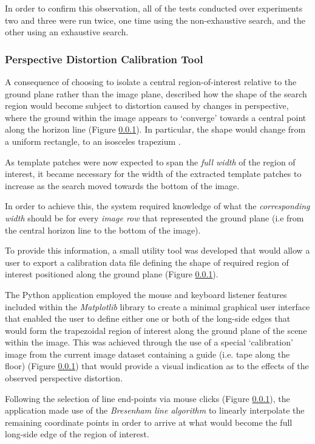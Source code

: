 In order to confirm this observation, all of the tests conducted over experiments two and three were run twice, one time using the non-exhaustive search, and the other using an exhaustive search.

\subsubsection{Perspective Distortion Calibration Tool}

A consequence of choosing to isolate a central region-of-interest relative to the ground plane rather than the image plane, described how the shape of the search region would become subject to distortion caused by changes in perspective, where the ground within the image appears to `converge' towards a central point along the horizon line (Figure \ref{}). In particular, the shape would change from a uniform rectangle, to an isosceles trapezium \cite{trapezium}.

As template patches were now expected to span the \textit{full width} of the region of interest, it became necessary for the width of the extracted template patches to increase as the search moved towards the bottom of the image. 

In order to achieve this, the system required knowledge of what the \textit{corresponding width} should be for every \textit{image row} that represented the ground plane (i.e from the central horizon line to the bottom of the image). 

To provide this information, a small utility tool was developed that would allow a user to export a calibration data file defining the shape of required region of interest positioned along the ground plane (Figure \ref{}). 

The Python application employed the mouse and keyboard listener features included within the \textit{Matplotlib} library \cite{matplotlib} to create a minimal graphical user interface that enabled the user to define either one or both of the long-side edges that would form the trapezoidal region of interest along the ground plane of the scene within the image. This was achieved through the use of a special `calibration' image from the current image dataset containing a guide (i.e. tape along the floor) (Figure \ref{}) that would provide a visual indication as to the effects of the observed perspective distortion. 

Following the selection of line end-points via mouse clicks (Figure \ref{}), the application made use of the \textit{Bresenham line algorithm} \cite{bresenham} to linearly interpolate the remaining coordinate points in order to arrive at what would become the full long-side edge of the region of interest. 

